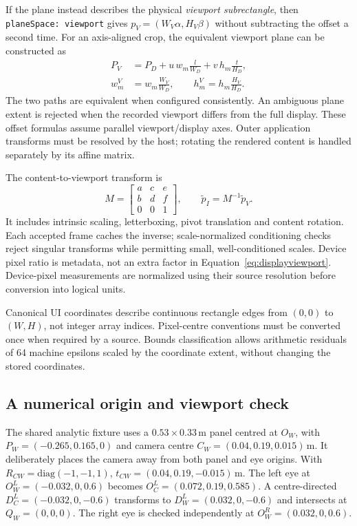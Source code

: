 \documentclass[sigconf,screen,nonacm]{acmart}
\newcommand{\code}[1]{\texttt{#1}}
\begin{document}
If the plane instead describes the physical \emph{viewport subrectangle}, then
\code{planeSpace: viewport} gives $p_V=(W_V\alpha,H_V\beta)$ without subtracting
the offset a second time. For an axis-aligned crop, the equivalent viewport plane
can be constructed as
\begin{align}
 P_V&=P_D+u\,w_m\frac{l}{W_D}+v\,h_m\frac{t}{H_D},\\
 w_m^V&=w_m\frac{W_V}{W_D},\qquad h_m^V=h_m\frac{H_V}{H_D}.
 \label{eq:viewportplane}
\end{align}
The two paths are equivalent when configured consistently. An ambiguous plane
extent is rejected when the recorded viewport differs from the full display.
These offset formulas assume parallel viewport/display axes. Outer application
transforms must be resolved by the host; rotating the rendered content is handled
separately by its affine matrix.

The content-to-viewport transform is
\begin{equation}
 M=\begin{bmatrix}a&c&e\\b&d&f\\0&0&1\end{bmatrix},\qquad
 \widetilde p_I=M^{-1}\widetilde p_V.
\end{equation}
It includes intrinsic scaling, letterboxing, pivot translation and content
rotation. Each accepted frame caches the inverse; scale-normalized conditioning
checks reject singular transforms while permitting small, well-conditioned
scales. Device pixel ratio is metadata, not an extra factor in
Equation~\ref{eq:displayviewport}. Device-pixel measurements are normalized using
their source resolution before conversion into logical units.

Canonical UI coordinates describe continuous rectangle edges from $(0,0)$ to
$(W,H)$, not integer array indices. Pixel-centre conventions must be converted
once when required by a source. Bounds classification allows arithmetic residuals
of 64 machine epsilons scaled by the coordinate extent, without changing the
stored coordinates.

\subsection{A numerical origin and viewport check}
The shared analytic fixture uses a $0.53\times0.33$\,m panel centred at $O_W$,
with $P_W=(-0.265,0.165,0)$ and camera centre
$C_W=(0.04,0.19,0.015)$\,m. It deliberately places the camera away from both panel
and eye origins. With $R_{CW}=\mathrm{diag}(-1,-1,1)$,
$t_{CW}=(0.04,0.19,-0.015)$\,m. The left eye at
$O_W^L=(-0.032,0,0.6)$ becomes $O_C^L=(0.072,0.19,0.585)$.
A centre-directed $D_C^L=(-0.032,0,-0.6)$ transforms to
$D_W^L=(0.032,0,-0.6)$ and intersects at $Q_W=(0,0,0)$.
The right eye is checked independently at $O_W^R=(0.032,0,0.6)$.
\end{document}
